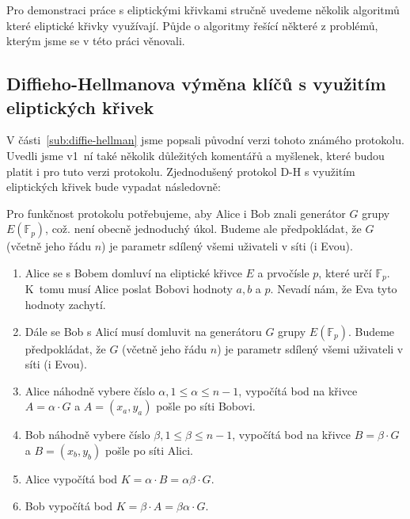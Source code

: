 \documentclass[
  program=infoi,
  biblatex=false,
  figures=true,
  glossaries,
  tables=false,
  sourcecodes=true,
  index
]{kidiplom}
\begin{document}
    Pro demonstraci práce s eliptickými křivkami stručně uvedeme několik algoritmů které eliptické křivky využívají.
    Půjde o algoritmy řešící některé z problémů, kterým jsme se v této práci věnovali.


    \subsection{Diffieho-Hellmanova výměna klíčů s využitím eliptických křivek}

        V části~\ref{sub:diffie-hellman} jsme popsali původní verzi tohoto známého protokolu.
        Uvedli jsme v1~ní také několik důležitých komentářů a myšlenek, které budou platit i pro tuto verzi protokolu.
        Zjednodušený protokol D-H s využitím eliptických křivek bude vypadat následovně:

        Pro funkčnost protokolu potřebujeme, aby Alice i Bob znali generátor $G$ grupy $E(\mathbb{F}_p)$, což.
        není obecně jednoduchý úkol.
        Budeme ale předpokládat, že $G$ (včetně jeho řádu $n$) je parametr sdílený všemi uživateli v síti (i Evou).

        \begin{enumerate}
            \item
                Alice se s Bobem domluví na eliptické křivce $E$ a prvočísle $p$, které určí $\mathbb{F}_p$.
                K~tomu musí Alice poslat Bobovi hodnoty $a, b$ a $p$.
                Nevadí nám, že Eva tyto hodnoty zachytí.
            \item
                Dále se Bob s Alicí musí domluvit na generátoru $G$ grupy $E(\mathbb{F}_p)$.
                Budeme předpokládat, že $G$ (včetně jeho řádu $n$) je parametr sdílený všemi uživateli v síti (i Evou).
            \item
                Alice náhodně vybere číslo $\alpha, 1 \leq \alpha \leq n-1$, vypočítá bod na křivce $A = \alpha \cdot G$ a
                $A = (x_a, y_a)$ pošle po síti Bobovi.
            \item
                Bob náhodně vybere číslo $\beta, 1 \leq \beta \leq n-1$, vypočítá bod na křivce $B = \beta \cdot G$ a
                $B = (x_b, y_b)$ pošle po síti Alici.
            \item
                Alice vypočítá bod $K= \alpha \cdot B = \alpha \beta \cdot G$.
            \item
                Bob vypočítá bod $K= \beta \cdot A = \beta \alpha \cdot G$.

        \end{enumerate}
\end{document}
